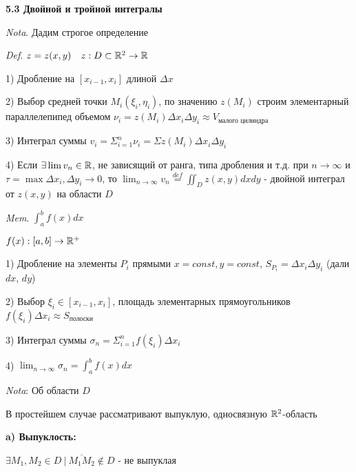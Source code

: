 \documentclass[12pt]{article}
\begin{document}
    \textbf{5.3 Двойной и тройной интегралы}

    \vspace{3mm}
\textit{Nota}. Дадим строгое определение

    \begin{multicols}{2}
        \vspace{3mm}
\textit{Def}. $z = z(x, y) \quad z : D \subset \mathbb{R}^2 \rightarrow \mathbb{R}$

        1) Дробление на $[x_{i-1}, x_i]$ длиной $\Delta x$

        2) Выбор средней точки $M_i(\xi_i, \eta_i)$, по значению $z(M_i)$ строим элементарный параллелепипед объемом
        $\nu_i = z(M_i) \Delta x_i \Delta y_i \approx V_{\text{малого цилиндра}}$

        3) Интеграл суммы $\displaystyle v_i = \Sigma_{i=1}^n \nu_i = \Sigma z(M_i) \Delta x_i \Delta y_i$

        4) Если $\exists \lim v_n \in \mathbb{R}$, не зависящий от ранга, типа дробления и т.д. при $n \rightarrow \infty$ и
        $\tau = \max \Delta x_i, \Delta y_i \to 0$, то $\displaystyle \lim_{n\to\infty} v_n \stackrel{def}{=} \iint_D z(x, y) dx dy$ - двойной интеграл от $z(x, y)$ на области $D$

        \vspace{3mm}
\textit{Mem}. $\displaystyle \int_a^b f(x) dx$

        $f(x) : [a, b] \rightarrow \mathbb{R}^+$

        1) Дробление на элементы $P_i$ прямыми $x = const, y = const$, $S_{P_i} = \Delta x_i \Delta y_i$ (дали $dx$, $dy$)

        2) Выбор $\xi_i \in [x_{i-1}, x_i]$, площадь элементарных прямоугольников $f(\xi_i)\Delta x_i \approx S_{\text{полоски}}$

        3) Интеграл суммы $\displaystyle \sigma_n = \Sigma_{i=1}^n f(\xi_i) \Delta x_i$

        4) $\displaystyle \lim_{n\to\infty} \sigma_n = \int^b_a f(x) dx$
    \end{multicols}

    \vspace{3mm}
\textit{Nota}: Об области $D$

    В простейшем случае рассматривают выпуклую, односвязную $\mathbb{R}^2$-область

    \vspace{5mm}
    \textbf{
    a) Выпуклость:}

    $\exists M_1, M_2 \in D \ | \ \overline{M_1 M_2} \notin D$ - не выпуклая
\end{document}

